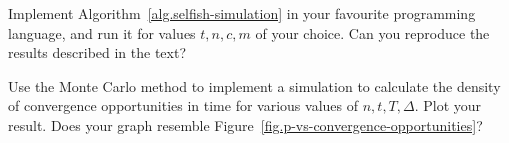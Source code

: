 \begin{problems}
  \item Implement Algorithm~\ref{alg.selfish-simulation} in your favourite programming language,
        and run it for values $t, n, c, m$ of your choice. Can you reproduce the results described
        in the text?\label{problem:selfish-simulation}
  \item Use the Monte Carlo method to implement a simulation to calculate the density of
        convergence opportunities in time for various values of $n, t, T, \Delta$. Plot your
        result. Does your graph resemble Figure~\ref{fig.p-vs-convergence-opportunities}?








\end{problems}
